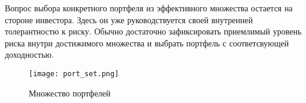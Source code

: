 Вопрос выбора конкретного портфеля из эффективного множества остается на стороне инвестора. Здесь он уже руководствуется
своей внутренней толерантностю к риску. Обычно достаточно зафиксировать приемлимый уровень риска внутри достижимого множества
и выбрать портфель с соответсвующей доходностью. 


\begin{figure}[H]
	\centering
	\texttt{[image: port\_set.png]}
	\caption{Множество портфелей}
	\label{fig:port_set}
\end{figure}


